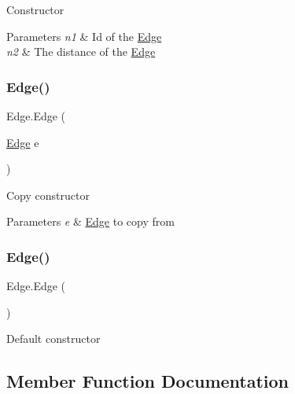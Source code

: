 Constructor 


\begin{DoxyParams}{Parameters}
{\em n1} & Id of the \hyperlink{classEdge}{Edge}\\
\hline
{\em n2} & The distance of the \hyperlink{classEdge}{Edge}\\
\hline
\end{DoxyParams}
\mbox{\label{classEdge_ae20fecc11a724d2b3c828f4f2ab9f838}} 
\subsubsection{\texorpdfstring{Edge()}{Edge()}\hspace{0.1cm}{\footnotesize\ttfamily [3/4]}}
{\footnotesize\ttfamily Edge.\+Edge (\begin{DoxyParamCaption}\item[{\hyperlink{classEdge}{Edge}}]{e }\end{DoxyParamCaption})\hspace{0.3cm}{\ttfamily [inline]}}



Copy constructor 


\begin{DoxyParams}{Parameters}
{\em e} & \hyperlink{classEdge}{Edge} to copy from\\
\hline
\end{DoxyParams}
\mbox{\label{classEdge_acc2a99d2cb4375bd9242a3961bf0bba5}} 
\subsubsection{\texorpdfstring{Edge()}{Edge()}\hspace{0.1cm}{\footnotesize\ttfamily [4/4]}}
{\footnotesize\ttfamily Edge.\+Edge (\begin{DoxyParamCaption}{ }\end{DoxyParamCaption})\hspace{0.3cm}{\ttfamily [inline]}}



Default constructor 



\subsection{Member Function Documentation}
\mbox{\label{classEdge_aa5f9c64bec6f5fbea2031c711e2ad4e0}} 
